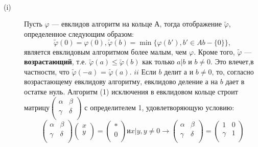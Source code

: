 \documentclass{mai_book}
\begin{document}
\begin{lemma}
\
 \begin{description} \item[(i)]  Пусть $\varphi$ — евклидов алгоритм на кольце $А$, тогда отображение \linebreak $\tilde{\varphi}$, определенное следующим образом:
$${\tilde{\varphi}}(0)=\varphi(0), \tilde{\varphi}(b)= \min\{ \varphi(b'), b' \in Ab - \{0\} \},$$
является евклидовым алгоритмом более малым, чем $\varphi$. Кроме того, $\tilde{\varphi}$ \linebreak --- \textbf{возрастающий}, т.е. ${\tilde{\varphi}}(a) \le  {\tilde{\varphi}} (b)$ как только $ a | b $ и $ b \ne 0 $. Это влечет,\linebreak в частности, что ${\tilde{\varphi}} (-a)$ = ${\tilde{\varphi}} (a)$.
$ii$ Если $b$ делит $а$ и $b \ne 0$, то, согласно возрастающему евклидову \linebreak алгоритму, евклидово деление $а$ на $b$ дает в остатке нуль.  
Алгоритм (1) исключения в евклидовом кольце строит матрицу\linebreak ${\left( \begin{array}{ccc}
\alpha & \beta \\
\gamma & \delta \\
\end{array} \right)}$ с определителем 1, удовлетворяющую условию:
$${\left( \begin{array}{ccc}
\alpha & \beta \\
\gamma & \delta \\
\end{array} \right)}{\left( \begin{array}{ccc}
x \\
y \\
\end{array} \right)}={\left( \begin{array}{ccc}
*\\
0 \\
\end{array} \right)} и  x|y, y \ne 0 \longrightarrow {\left( \begin{array}{ccc}
\alpha & \beta \\
\gamma & \delta \\
\end{array} \right)}={\left( \begin{array}{ccc}
1 & 0\\
\gamma & 1 \\
\end{array} \right)}$$
\end{description}
\end{lemma}
\end{document}
